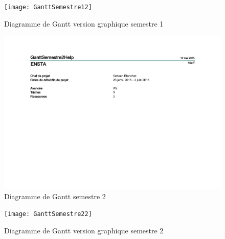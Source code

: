\begin{figure}[H]
  \centering
  \texttt{[image: GanttSemestre12]}
  \caption{Diagramme de Gantt version graphique semestre 1}
  \label{fig:GanttGraphique}
\end{figure}

\begin{figure}[H]
  \centering
  \includegraphics[scale=1]{GanttSemestre2}
  \caption{Diagramme de Gantt semestre 2}
  \label{fig:GanttSemestre2}
\end{figure}

\begin{figure}[H]
  \centering
  \texttt{[image: GanttSemestre22]}
  \caption{Diagramme de Gantt version graphique semestre 2}
  \label{fig:GanttSemestre22}
\end{figure}